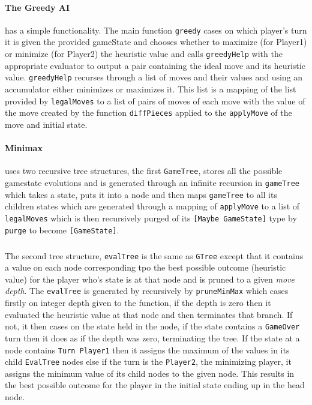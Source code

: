 \documentclass[11pt]{article}
\begin{document}
\paragraph{The Greedy AI} has a simple functionality. The main function \verb|greedy| cases on which player's turn it is given the provided gameState and chooses whether to maximize (for Player1) or minimize (for Player2) the heuristic value and calls \verb|greedyHelp| with the appropriate evaluator to output a pair containing the ideal move and its heuristic value. \verb|greedyHelp| recurses through a list of moves and their values and using an accumulator either minimizes or maximizes it. This list is a mapping of the list provided by \verb|legalMoves| to a list of pairs of moves of each move with the value of the move created by the function \verb|diffPieces| applied to the \verb|applyMove| of the move and initial state.

\paragraph{Minimax} uses two recursive tree structures, the first \verb|GameTree|, stores all the possible gamestate evolutions and is generated through an infinite recursion in \verb|gameTree| which takes a state, puts it into a node and then maps \verb|gameTree| to all its children states which are generated through a mapping of \verb|applyMove| to a list of \verb|legalMoves| which is then recursively purged of its \verb|[Maybe GameState]| type by \verb|purge| to become \verb|[GameState]|.

\subparagraph*{}The second tree structure, \verb|evalTree| is the same as \verb|GTree| except that it contains a value on each node corresponding tpo the best possible outcome (heuristic value) for the player who's state is at that node and is pruned to a given \textit{move depth}. The \verb|evalTree| is generated by recursively by \verb|pruneMinMax| which cases firstly on integer depth given to the function, if the depth is zero then it evaluated the heuristic value at that node and then terminates that branch. If not, it then cases on the state held in the node, if the state contains a \verb|GameOver| turn then it does as if the depth was zero, terminating the tree. If the state at a node contains \verb|Turn Player1| then it assigns the maximum of the values in its child \verb|EvalTree| nodes else if the turn is the \verb|Player2|, the minimizing player, it assigns the minimum value of its child nodes to the given node. This results in the best possible outcome for the player in the initial state ending up in the head node.
\end{document}
